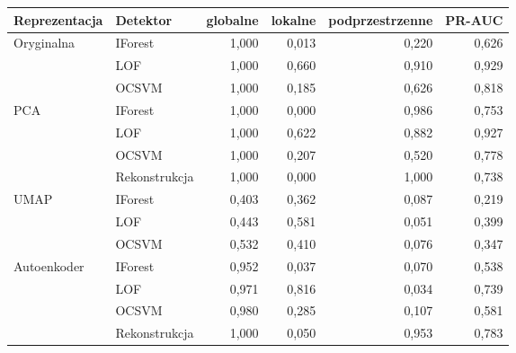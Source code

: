 \begin{tabular}{llrrrr}
\toprule
Reprezentacja & Detektor & globalne & lokalne & podprzestrzenne & PR-AUC \\
\midrule
Oryginalna & IForest & 1,000 & 0,013 & 0,220 & 0,626 \\
 & LOF & 1,000 & 0,660 & 0,910 & 0,929 \\
 & OCSVM & 1,000 & 0,185 & 0,626 & 0,818 \\
PCA & IForest & 1,000 & 0,000 & 0,986 & 0,753 \\
 & LOF & 1,000 & 0,622 & 0,882 & 0,927 \\
 & OCSVM & 1,000 & 0,207 & 0,520 & 0,778 \\
 & Rekonstrukcja & 1,000 & 0,000 & 1,000 & 0,738 \\
UMAP & IForest & 0,403 & 0,362 & 0,087 & 0,219 \\
 & LOF & 0,443 & 0,581 & 0,051 & 0,399 \\
 & OCSVM & 0,532 & 0,410 & 0,076 & 0,347 \\
Autoenkoder & IForest & 0,952 & 0,037 & 0,070 & 0,538 \\
 & LOF & 0,971 & 0,816 & 0,034 & 0,739 \\
 & OCSVM & 0,980 & 0,285 & 0,107 & 0,581 \\
 & Rekonstrukcja & 1,000 & 0,050 & 0,953 & 0,783 \\
\bottomrule
\end{tabular}

